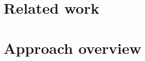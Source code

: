 \documentclass[runningheads]{llncs}
\begin{document}
\section{Related work}

\section{Approach overview}


\end{document}
